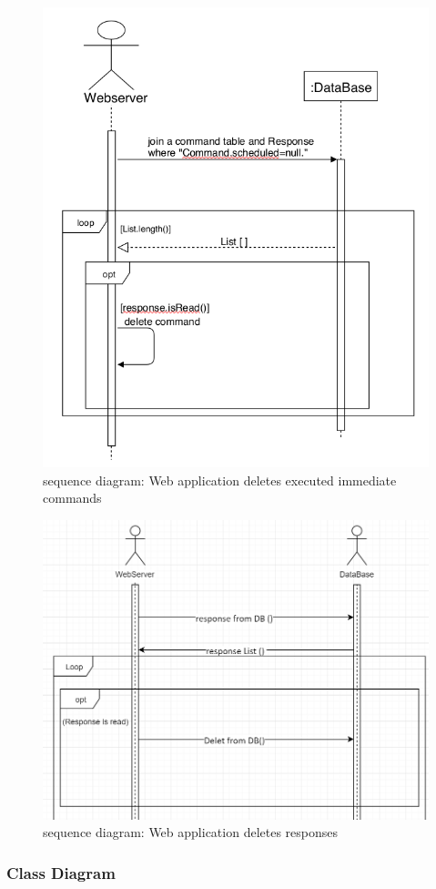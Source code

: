 \documentclass[12pt, oneside, a4paper]{book}
\begin{document}
				\begin{figure}[H]
					\caption{sequence diagram: Web application deletes executed immediate commands}
					\label{web_delete_c}
					\includegraphics[width=\linewidth]{img/sequence_w_delete_c.png}
				\end{figure}
				\begin{figure}[H]
					\caption{sequence diagram: Web application deletes responses}
					\label{web_delete_r}
					\includegraphics[width=\linewidth]{img/sequence_web_del_r.png}
				\end{figure}
				\newpage\subsubsection{Class Diagram}
\end{document}
